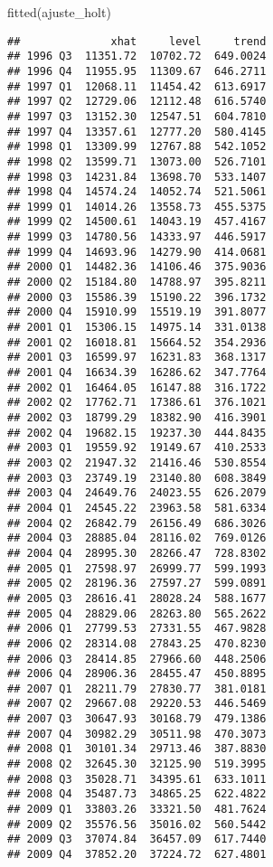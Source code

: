 \documentclass[
]{article}
\newenvironment{Shaded}{\begin{snugshade}}{\end{snugshade}}
\newcommand{\FunctionTok}[1]{\textcolor[rgb]{0.00,0.00,0.00}{#1}}
\newcommand{\NormalTok}[1]{#1}
\begin{document}
\begin{Shaded}
\begin{Highlighting}[]
\FunctionTok{fitted}\NormalTok{(ajuste\_holt)}
\end{Highlighting}
\end{Shaded}

\begin{verbatim}
##              xhat     level     trend
## 1996 Q3  11351.72  10702.72  649.0024
## 1996 Q4  11955.95  11309.67  646.2711
## 1997 Q1  12068.11  11454.42  613.6917
## 1997 Q2  12729.06  12112.48  616.5740
## 1997 Q3  13152.30  12547.51  604.7810
## 1997 Q4  13357.61  12777.20  580.4145
## 1998 Q1  13309.99  12767.88  542.1052
## 1998 Q2  13599.71  13073.00  526.7101
## 1998 Q3  14231.84  13698.70  533.1407
## 1998 Q4  14574.24  14052.74  521.5061
## 1999 Q1  14014.26  13558.73  455.5375
## 1999 Q2  14500.61  14043.19  457.4167
## 1999 Q3  14780.56  14333.97  446.5917
## 1999 Q4  14693.96  14279.90  414.0681
## 2000 Q1  14482.36  14106.46  375.9036
## 2000 Q2  15184.80  14788.97  395.8211
## 2000 Q3  15586.39  15190.22  396.1732
## 2000 Q4  15910.99  15519.19  391.8077
## 2001 Q1  15306.15  14975.14  331.0138
## 2001 Q2  16018.81  15664.52  354.2936
## 2001 Q3  16599.97  16231.83  368.1317
## 2001 Q4  16634.39  16286.62  347.7764
## 2002 Q1  16464.05  16147.88  316.1722
## 2002 Q2  17762.71  17386.61  376.1021
## 2002 Q3  18799.29  18382.90  416.3901
## 2002 Q4  19682.15  19237.30  444.8435
## 2003 Q1  19559.92  19149.67  410.2533
## 2003 Q2  21947.32  21416.46  530.8554
## 2003 Q3  23749.19  23140.80  608.3849
## 2003 Q4  24649.76  24023.55  626.2079
## 2004 Q1  24545.22  23963.58  581.6334
## 2004 Q2  26842.79  26156.49  686.3026
## 2004 Q3  28885.04  28116.02  769.0126
## 2004 Q4  28995.30  28266.47  728.8302
## 2005 Q1  27598.97  26999.77  599.1993
## 2005 Q2  28196.36  27597.27  599.0891
## 2005 Q3  28616.41  28028.24  588.1677
## 2005 Q4  28829.06  28263.80  565.2622
## 2006 Q1  27799.53  27331.55  467.9828
## 2006 Q2  28314.08  27843.25  470.8230
## 2006 Q3  28414.85  27966.60  448.2506
## 2006 Q4  28906.36  28455.47  450.8895
## 2007 Q1  28211.79  27830.77  381.0181
## 2007 Q2  29667.08  29220.53  446.5469
## 2007 Q3  30647.93  30168.79  479.1386
## 2007 Q4  30982.29  30511.98  470.3073
## 2008 Q1  30101.34  29713.46  387.8830
## 2008 Q2  32645.30  32125.90  519.3995
## 2008 Q3  35028.71  34395.61  633.1011
## 2008 Q4  35487.73  34865.25  622.4822
## 2009 Q1  33803.26  33321.50  481.7624
## 2009 Q2  35576.56  35016.02  560.5442
## 2009 Q3  37074.84  36457.09  617.7440
## 2009 Q4  37852.20  37224.72  627.4801

\end{verbatim}
\end{document}
